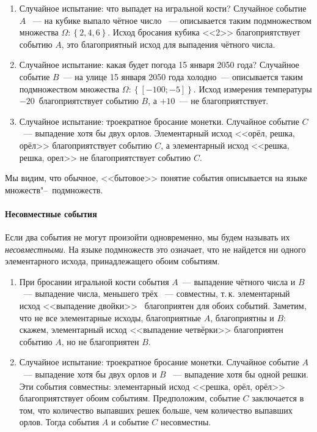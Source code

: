 \documentclass[11pt]{article}
\begin{document}
\begin{examples}
\item[]
\begin{enumerate}
	\item Случайное испытание: что выпадет на игральной кости? Случайное событие $A$ ~--- на кубике выпало чётное число ~---    описывается таким подмножеством множества $\Omega: \left\{2,4,6\right\}$. Исход бросания кубика <<2>> благоприятствует событию $A$, это благоприятный исход для выпадения чётного числа.
	
	\item Случайное испытание: какая будет погода 15 января 2050 года? Случайное событие $B$~--- на улице 15 января 2050 года холодно~--- описывается таким подмножеством множества $\Omega: \left\{\left[-100;-5\right]\right\}$. Исход измерения температуры $-20$~благоприятствует событию $B$, а $+10$~--- не благоприятствует.
	
	\item Случайное испытание: троекратное бросание монетки. Случайное событие $C$~--- выпадение хотя бы двух орлов. Элементарный исход <<орёл, решка, орёл>> благоприятствует событию $C$, а элементарный исход <<решка, решка, орел>> не благоприятствует событию $C$.
\end{enumerate}
\end{examples}

Мы видим, что обычное, <<бытовое>> понятие события описывается на языке множеств"--~подмножеств.

\paragraph{Несовместные события} Если два события не могут произойти одновременно, мы будем называть их \emph{несовместными}. На языке подмножеств это означает, что не найдется ни одного элементарного исхода, принадлежащего обоим событиям.

\begin{examples}
\item[]
\begin{enumerate}
	\item При бросании игральной кости события $A$~--- выпадение чётного числа и $B$~--- выпадение числа, меньшего трёх ~--- совместны, т.\,к. элементарный исход <<выпадение двойки>> \ благоприятен для обоих событий. Заметим, что не все элементарные исходы, благоприятные $A$, благоприятны и $B$: скажем, элементарный исход <<выпадение четвёрки>> благоприятен событию $A$, но не благоприятен $B$.

	\item Случайное испытание: троекратное бросание монетки. Случайное событие $A$ ~--- выпадение хотя бы двух орлов и $B$ ~--- выпадение хотя бы одной решки. Эти события совместны: элементарный исход <<решка, орёл, орёл>> благоприятствует обоим событиям. Предположим, событие $C$ заключается в том, что количество выпавших решек больше, чем количество выпавших орлов. Тогда события $A$ и событие $C$ несовместны.
\end{enumerate}
\end{examples}
\end{document}

